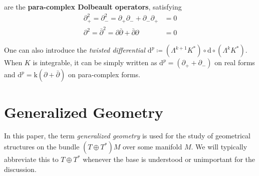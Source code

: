 \documentclass{article}
\newcommand{\TT}{{T\oplus T^*}}
\newcommand{\PS}{\mathcal{P}}
\newcommand{\ap}{\alpha}
\newcommand{\p}{\partial}
\newcommand{\rd}{\mathrm{d}}
\newcommand{\kk}{\mathrm{k}}
\newtheorem{lemma}[theorem]{Lemma}
\theoremstyle{definition}
\theoremstyle{definition}
\theoremstyle{remark}
\begin{document}
are the \textbf{para-complex Dolbeault operators}, satisfying
\begin{align*}
\p_+^2=\p_-^2=\p_+\p_-+\p_-\p_+&=0\\
\p^2=\bar{\p}^2=\p\bar{\p}+\bar{\p}\p&=0
\end{align*}

One can also introduce the {\it twisted differential $\rd^p\coloneqq(\Lambda^{k+1}K^*)\circ\rd\circ (\Lambda^kK^*)$}. When $K$ is integrable, it can be simply written as $\rd^p=(\p_++\p_-)$ on real forms and $\rd^p=\kk (\p+\bar{\p})$ on para-complex forms.
  


\section{Generalized Geometry}
In this paper, the term {\it generalized geometry} is used for the study of geometrical structures on the bundle $(\TT)M$ over some manifold $M$. We will typically abbreviate this to $\TT$ whenever the base is understood or unimportant for the discussion.
\end{document}
